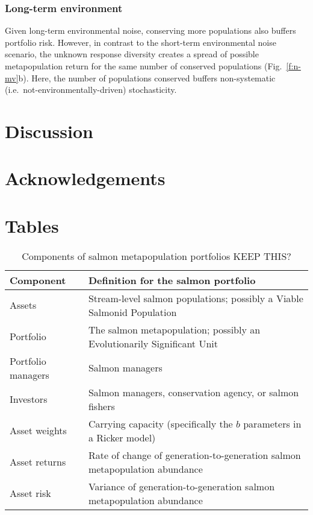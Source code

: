 \subsubsection{Long-term environment}

Given long-term environmental noise, conserving more populations also buffers portfolio risk. However, in contrast to the short-term environmental noise scenario, the unknown response diversity creates a spread of possible metapopulation return for the same number of conserved populations (Fig.~\ref{f:n-mv}b). Here, the number of populations conserved buffers non-systematic (i.e.~not-environmentally-driven) stochasticity.

\section{Discussion}

\section{Acknowledgements}





\clearpage

\section{Tables}

\begin{table}[h!]
\centering
\small
\caption{Components of salmon metapopulation portfolios KEEP THIS?}
\begin{tabular}{p{3.6cm}p{7.5cm}}
\toprule
Component          & Definition for the salmon portfolio\\
\midrule
Assets             & Stream-level salmon populations; possibly a Viable Salmonid Population\\
Portfolio          & The salmon metapopulation; possibly an Evolutionarily Significant Unit\\
Portfolio managers & Salmon managers\\
Investors          & Salmon managers, conservation agency, or salmon fishers\\
Asset weights      & Carrying capacity (specifically the $b$ parameters in a Ricker model)\\
Asset returns      & Rate of change of generation-to-generation salmon metapopulation abundance\\
Asset risk         & Variance of generation-to-generation salmon metapopulation abundance\\
\bottomrule
\end{tabular}
\label{t:port}
\end{table}

